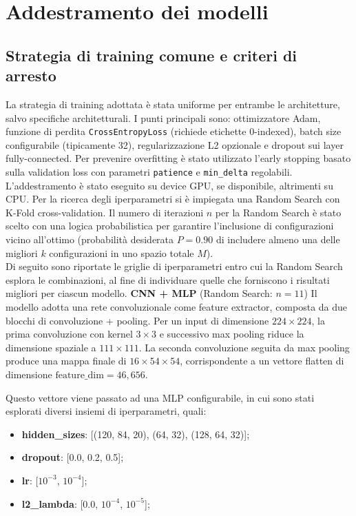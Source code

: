 \documentclass[a4paper,12pt]{report}
\begin{document}
	\section{Addestramento dei modelli}
	
	\subsection{Strategia di training comune e criteri di arresto}
	La strategia di training adottata è stata uniforme per entrambe le architetture, salvo specifiche architetturali. I punti principali sono: ottimizzatore Adam, funzione di perdita \texttt{CrossEntropyLoss} (richiede etichette 0-indexed), batch size configurabile (tipicamente 32), regularizzazione L2 opzionale e dropout sui layer fully-connected. Per prevenire overfitting è stato utilizzato l'early stopping basato sulla validation loss con parametri \texttt{patience} e \texttt{min\_delta} regolabili. L'addestramento è stato eseguito su device GPU, se disponibile, altrimenti su CPU. Per la ricerca degli iperparametri si è impiegata una Random Search con K-Fold cross-validation. Il numero di iterazioni \(n\) per la Random Search è stato scelto con una logica probabilistica per garantire l'inclusione di configurazioni vicino all'ottimo (probabilità desiderata \(P=0.90\) di includere almeno una delle migliori \(k\) configurazioni in uno spazio totale \(M\)). \\
	
	Di seguito sono riportate le griglie di iperparametri entro cui la Random Search esplora le combinazioni, al fine di individuare quelle che forniscono i risultati migliori per ciascun modello.
	\smallskip
	\noindent\textbf{CNN + MLP} \quad (Random Search: $n=11$)  
	Il modello adotta una rete convoluzionale come feature extractor, composta da due blocchi di convoluzione + pooling. Per un input di dimensione \(224\times224\), la prima convoluzione con kernel \(3\times3\) e successivo max pooling riduce la dimensione spaziale a \(111\times111\). La seconda convoluzione seguita da max pooling produce una mappa finale di \(16\times54\times54\), corrispondente a un vettore flatten di dimensione \(\text{feature\_dim} = 46,656\).
	
	Questo vettore viene passato ad una MLP configurabile, in cui sono stati esplorati diversi insiemi di iperparametri, quali:  
	\begin{itemize}
		\item \textbf{hidden\_sizes}: [(120, 84, 20), (64, 32), (128, 64, 32)];
		\item \textbf{dropout}: [0.0, 0.2, 0.5];
		\item \textbf{lr}: [$10^{-3}$, $10^{-4}$];
		\item \textbf{l2\_lambda}: [0.0, $10^{-4}$, $10^{-5}$];
	\end{itemize}
	
\end{document}
